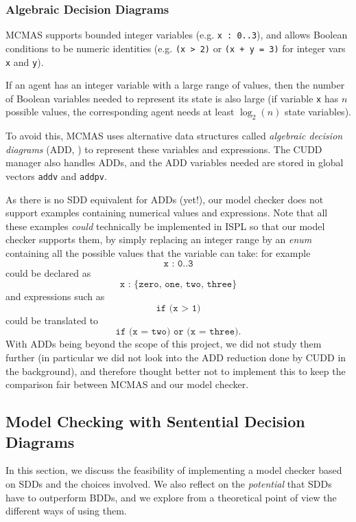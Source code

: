 \documentclass[11pt]{article}
\begin{document}
\subsubsection{Algebraic Decision Diagrams}
\label{algebraic_decision_diagrams}

MCMAS supports bounded integer variables (e.g. \texttt{x : 0..3}), and allows Boolean conditions to be numeric identities (e.g. \texttt{(x > 2)} or \texttt{(x + y = 3)} for integer vars \texttt{x} and \texttt{y}). 

If an agent has an integer variable with a large range of values, then the number of Boolean variables needed to represent its state is also large (if variable \texttt{x} has $n$ possible values, the corresponding agent needs at least $\log_2(n)$ state variables). 

To avoid this, MCMAS uses alternative data structures called \textit{algebraic decision diagrams} (ADD, \cite{add}) to represent these variables and expressions. The CUDD manager also handles ADDs, and the ADD variables needed are stored in global vectors \texttt{addv} and \texttt{addpv}.

As there is no SDD equivalent for ADDs (yet!), our model checker does not support examples containing numerical values and expressions.
Note that all these examples \textit{could} technically be implemented in ISPL so that our model checker supports them, by simply replacing an integer range by an \textit{enum} containing all the possible values that the variable can take: for example 
$$\texttt{x : 0..3} $$
could be declared as $$\texttt{x : \{zero, one, two, three\}}$$
and expressions such as $$\texttt{if (x > 1)}$$ could be translated to $$\texttt{if (x = two) or (x = three)}.$$
With ADDs being beyond the scope of this project, we did not study them further (in particular we did not look into the ADD reduction done by CUDD in the background), and therefore thought better not to implement this to keep the comparison fair between MCMAS and our model checker. 

\subsection{Model Checking with Sentential Decision Diagrams}

In this section, we discuss the feasibility of implementing a model checker based on SDDs and the choices involved. We also reflect on the \textit{potential }that SDDs have to outperform BDDs, and we explore from a theoretical point of view the different ways of using them.
\end{document}
